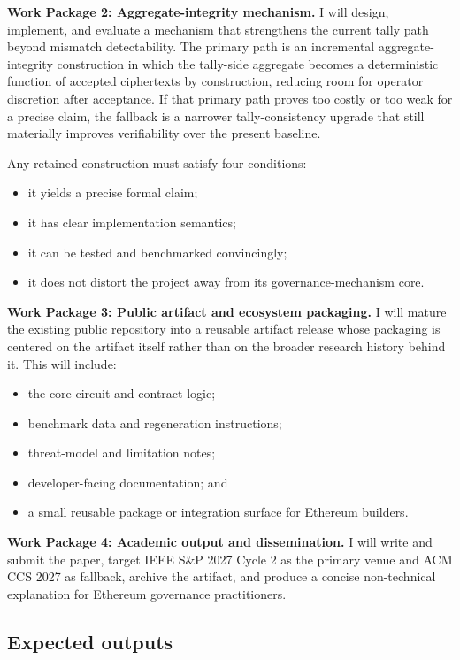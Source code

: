 \documentclass[11pt]{article}
\begin{document}
\textbf{Work Package 2: Aggregate-integrity mechanism.}
I will design, implement, and evaluate a mechanism that strengthens the current
tally path beyond mismatch detectability. The primary path is an incremental
aggregate-integrity construction in which the tally-side aggregate becomes a
deterministic function of accepted ciphertexts by construction, reducing room
for operator discretion after acceptance. If that primary path proves too costly
or too weak for a precise claim, the fallback is a narrower tally-consistency
upgrade that still materially improves verifiability over the present baseline.

Any retained construction must satisfy four conditions:

\begin{itemize}[leftmargin=*]
\item it yields a precise formal claim;
\item it has clear implementation semantics;
\item it can be tested and benchmarked convincingly;
\item it does not distort the project away from its governance-mechanism core.
\end{itemize}

\textbf{Work Package 3: Public artifact and ecosystem packaging.}
I will mature the existing public repository into a reusable artifact release
whose packaging is centered on the artifact itself rather than on the broader
research history behind it. This will include:

\begin{itemize}[leftmargin=*]
\item the core circuit and contract logic;
\item benchmark data and regeneration instructions;
\item threat-model and limitation notes;
\item developer-facing documentation; and
\item a small reusable package or integration surface for Ethereum builders.
\end{itemize}

\textbf{Work Package 4: Academic output and dissemination.}
I will write and submit the paper, target IEEE S\&P 2027 Cycle 2 as the
primary venue and ACM CCS 2027 as fallback, archive the artifact, and produce a
concise non-technical explanation for Ethereum governance practitioners.

\subsection{Expected outputs}
\end{document}
